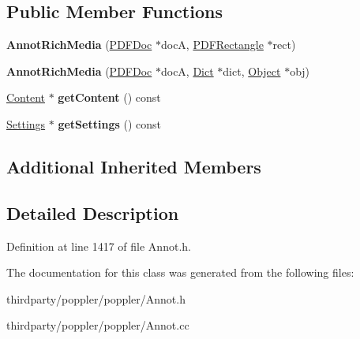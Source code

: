 \subsection*{Public Member Functions}
\begin{DoxyCompactItemize}
\item 
\mbox{\label{class_annot_rich_media_af3385b100b448f2298466bd7008bff02}} 
{\bfseries Annot\+Rich\+Media} (\hyperlink{class_p_d_f_doc}{P\+D\+F\+Doc} $\ast$docA, \hyperlink{class_p_d_f_rectangle}{P\+D\+F\+Rectangle} $\ast$rect)
\item 
\mbox{\label{class_annot_rich_media_a97fd00ad8c543a58b8fac782de2baa02}} 
{\bfseries Annot\+Rich\+Media} (\hyperlink{class_p_d_f_doc}{P\+D\+F\+Doc} $\ast$docA, \hyperlink{class_dict}{Dict} $\ast$dict, \hyperlink{class_object}{Object} $\ast$obj)
\item 
\mbox{\label{class_annot_rich_media_aa9b7237d7457cb5349eb0adf1fcbbb52}} 
\hyperlink{class_annot_rich_media_1_1_content}{Content} $\ast$ {\bfseries get\+Content} () const
\item 
\mbox{\label{class_annot_rich_media_ab2f66529a1c67718d3a30c304061bdd8}} 
\hyperlink{class_annot_rich_media_1_1_settings}{Settings} $\ast$ {\bfseries get\+Settings} () const
\end{DoxyCompactItemize}
\subsection*{Additional Inherited Members}


\subsection{Detailed Description}


Definition at line 1417 of file Annot.\+h.



The documentation for this class was generated from the following files\+:\begin{DoxyCompactItemize}
\item 
thirdparty/poppler/poppler/Annot.\+h\item 
thirdparty/poppler/poppler/Annot.\+cc\end{DoxyCompactItemize}
